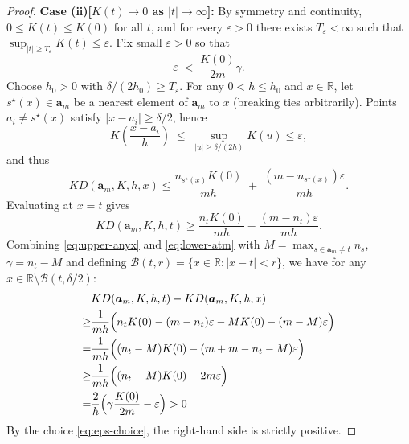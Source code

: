 \documentclass[
  12pt]{article}
\newcommand{\R}{\mathbb{R}}
\newcommand{\ba}{\boldsymbol{a}}
\begin{document}
\begin{proof}
\medskip
\noindent\textbf{Case (ii)[$K(t)\to 0$ as $|t|\to\infty$]:}
By symmetry and continuity, $0\leq K(t)\leq K(0)$ for all $t$, and for every $\varepsilon>0$ there exists $T_\varepsilon<\infty$ such that  $\sup_{|t|\geq T_\varepsilon} K(t)\leq \varepsilon$. Fix small $\varepsilon>0$ so that
\begin{equation}\label{eq:eps-choice}
\varepsilon \;<\; \frac{K(0)}{2m}\gamma.
\end{equation}
Choose $h_0>0$ with $\delta/(2h_0)\ge T_\varepsilon$. For any $0<h\leq h_0$ and $x\in\mathbb{R}$, let $s^\star(x)\in \ba_m$ be a nearest element of $\ba_m$ to $x$ (breaking ties arbitrarily). Points $a_i\neq s^\star(x)$ satisfy $|x-a_i|\geq \delta/2$, hence
$$
K\left(\frac{x-a_i}{h}\right) \;\le\; \sup_{|u|\geq \delta/(2h)} K(u) \leq \varepsilon,
$$
and thus
\begin{equation}\label{eq:upper-anyx}
KD(\ba_m,K,h,x)
\le \frac{n_{s^\star(x)}K(0)}{mh} \;+\; \frac{(m-n_{s^\star(x)})\varepsilon}{mh}.
\end{equation}
Evaluating at $x=t$ gives
\begin{equation}\label{eq:lower-atm}
KD(\ba_m,K,h,t)
\ge \frac{n_t K(0)}{mh} - \frac{(m-n_t)\varepsilon}{mh}.
\end{equation}
Combining \eqref{eq:upper-anyx} and \eqref{eq:lower-atm} with $M=\max_{s\in \ba_m\neq t} n_s$, $\gamma=n_t-M$ and defining $\mathcal{B}(t,r) = \{x \in \R: |x-t|<r\}$, we have for any $x\in\R \setminus \mathcal{B}(t,\delta/2)$:
\begin{equation}\label{eq:KD-bound-ball-out}
    \begin{split}
& KD(\ba_m,K,h,t) - KD(\ba_m,K,h,x)\\
\geq &\frac{1}{mh}\Bigl(n_t K(0)-(m-n_t)\varepsilon - MK(0) - (m - M)\varepsilon\Bigr)\\
= & \frac{1}{mh}\Bigl((n_t -M)K(0)-(m + m-n_t-M)\varepsilon\Bigr)\\
\geq & \frac{1}{mh}\Bigl((n_t -M)K(0)-2m\varepsilon\Bigr)\\
= & \frac{2}{h}\Bigl(\gamma \frac{K(0)}{2m}-\varepsilon\Bigr) > 0
    \end{split}
\end{equation}
By the choice \eqref{eq:eps-choice}, the right-hand side is strictly positive. 


\end{proof}
\end{document}
